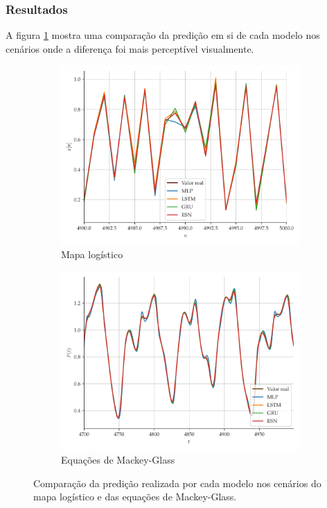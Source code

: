 \documentclass[aspectratio=169]{beamer}
\begin{document}
\begin{frame}
\frametitle{Resultados}
\justifying A figura \ref{fig:series-comparison} mostra uma comparação da predição em si de cada modelo nos cenários onde a diferença foi mais perceptível visualmente.

\begin{figure}[!ht]
     \begin{subfigure}[t]{0.4\textwidth} 
     \centering
         \includegraphics[scale=0.24]{vs-logistic-zoom.pdf}
         \caption{Mapa logístico}
     \end{subfigure}
     \centering
     \begin{subfigure}[t]{0.4\textwidth}
     \centering
         \includegraphics[scale=0.24]{vs-mackeyglass-zoom.pdf}
         \caption{Equações de Mackey-Glass}
     \end{subfigure}
     \centering     
     \caption{Comparação da predição realizada por cada modelo nos cenários do mapa logístico e das equações de Mackey-Glass.}
     \label{fig:series-comparison}
\end{figure}
\end{frame}
\end{document}
